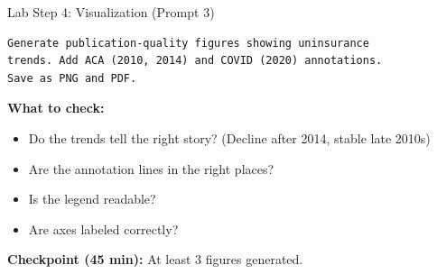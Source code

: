 \documentclass[10pt,english,aspectratio=169]{beamer}
\begin{document}
\begin{frame}[fragile]{Lab Step 4: Visualization (Prompt 3)}

\begin{lstlisting}[style=pythonstyle, language={}, basicstyle=\ttfamily\scriptsize]
Generate publication-quality figures showing uninsurance
trends. Add ACA (2010, 2014) and COVID (2020) annotations.
Save as PNG and PDF.
\end{lstlisting}

\vspace{0.3cm}
\textbf{What to check:}
\begin{itemize}
    \item Do the trends tell the right story? (Decline after 2014, stable late 2010s)
    \item Are the annotation lines in the right places?
    \item Is the legend readable?
    \item Are axes labeled correctly?
\end{itemize}

\vspace{0.3cm}
\textbf{Checkpoint (45 min):} At least 3 figures generated.

\end{frame}
\end{document}
